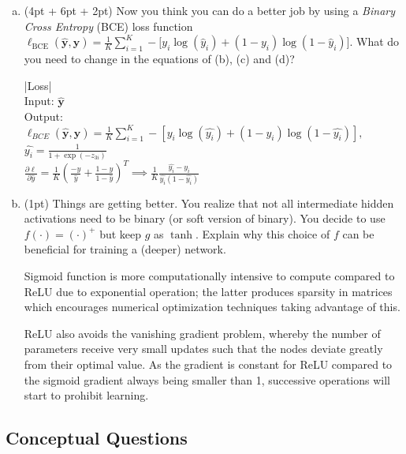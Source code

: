 \documentclass{article}
\begin{document}
\begin{enumerate}[(a)]
  \item
        (4pt + 6pt + 2pt) Now you think you can do a better job by using a \emph{Binary Cross Entropy} (BCE) loss function $\ell_\text{BCE}(\bm{\hat{y}}, \bm{y}) = \frac{1}{K}\sum_{i=1}^K -\big[y_i \log(\hat{y}_i) + (1 - y_i)\log(1 - \hat{y}_i)\big]$.
        What do you need to change in the equations of (b), (c) and (d)?
        \begin{tcolorbox}
          |Loss|\\
          Input: $\bm{\hat{y}}$\\
          Output:
          $\ell_{BCE}(\bm{\hat{y},y})=\frac{1}{K}\sum_{i=1}^{K}-[y_i\log(\hat{y_i})+(1-y_i)\log(1-\hat{y_i})],$\\
          $\hat{y_i}=\frac{1}{1+\exp(-z_{3i})}$\\
          $\frac{\partial \ell}{\partial
              \hat{y}}=\frac{1}{K}(\frac{-y}{\hat{y}}+\frac{1-y}{1-\hat{y}})^T\implies \frac{1}{K}\frac{\hat{y_i}-y_i}{\hat{y_i}(1-\hat{y_i})}$ 
        \end{tcolorbox}

  \item
        (1pt) Things are getting better.
        You realize that not all intermediate hidden activations need to be binary (or soft version of binary).
        You decide to use $f(\cdot) = (\cdot)^+$ but keep $g$ as $\tanh$. Explain why this choice of $f$ can be beneficial for training a (deeper) network.
        \begin{tcolorbox}
          Sigmoid function is more computationally intensive to compute compared
          to ReLU due to exponential operation; the latter produces sparsity in matrices
          which encourages numerical optimization techniques taking advantage of this.
        \end{tcolorbox}
        \begin{tcolorbox}
          ReLU also avoids the vanishing gradient problem, whereby the number of
          parameters receive very small updates such that the nodes deviate greatly from
          their optimal value. As the gradient is constant for ReLU compared to the
          sigmoid gradient always being smaller than 1, successive operations will start
          to prohibit learning.
        \end{tcolorbox}

\end{enumerate}

\subsection{Conceptual Questions}
\end{document}
